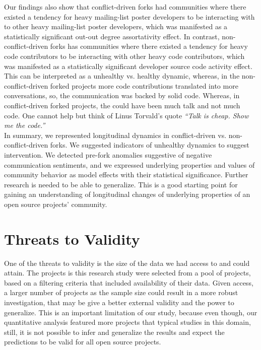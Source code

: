 \documentclass[12pt,letterpaper]{gthesis2}  %
\begin{document}
Our findings also show that conflict-driven forks had communities where there existed a tendency for heavy mailing-list poster developers to be interacting with to other heavy mailing-list poster developers, which was manifested as a statistically significant out-out degree assortativity effect. In contrast, non-conflict-driven forks has communities where there existed a tendency for heavy code contributors to be interacting with other heavy code contributors, which was manifested as a statistically significant developer source code activity effect. This can be interpreted as a unhealthy vs. healthy dynamic, whereas, in the non-conflict-driven forked projects more code contributions translated into more conversations, so, the communication was backed by solid code. Whereas, in conflict-driven forked projects, the could have been much talk and not much code. One cannot help but think of Linus Torvald's quote \textit{``Talk is cheap. Show me the code.''}\\

In summary, we represented longitudinal dynamics in conflict-driven vs. non-conflict-driven forks. We suggested indicators of unhealthy dynamics to suggest intervention. We detected pre-fork anomalies suggestive of negative communication sentiments, and we expressed underlying properties and values of community behavior as model effects with their statistical significance. Further research is needed to be able to generalize. This is a good starting point for gaining an understanding of longitudinal changes of underlying properties of an open source projects' community.\\




\pagebreak

\section{Threats to Validity}
\label{threatsToValidity}

One of the threats to validity is the size of the data we had access to and could attain. The projects is this research study were selected from a pool of projects, based on a filtering criteria that included availability of their data. Given access, a larger number of projects as the sample size could result in a more robust investigation, that may be give a better external validity and the power to generalize. This is an important limitation of our study, because even though, our quantitative analysis featured more projects that typical studies in this domain, still, it is not possible to infer and generalize the results and expect the predictions to be valid for all open source projects. 
\end{document}
